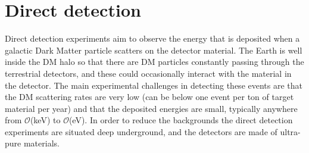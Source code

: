 \chapter{Direct detection}\label{chapter:direct}

Direct detection experiments aim to observe the energy that is deposited when a galactic Dark Matter particle scatters on the detector material. The Earth is well inside the DM halo so that there are DM particles constantly passing  through the terrestrial detectors, and these could occasionally interact with the material in the detector. The main experimental challenges in detecting these events are that the DM scattering rates are very low (can be below one event per ton of target material per year) and that the deposited energies are small, typically anywhere from ${\mathcal O}$(keV) to ${\mathcal O}$(eV).  In order to reduce the backgrounds the direct detection experiments are situated deep underground, and the detectors  are made of ultra-pure materials.

\medskip

